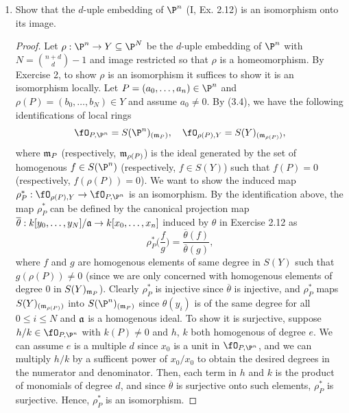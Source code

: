 \documentclass[a4paper]{article}
\begin{document}
\begin{enumerate} [label=\textbf{\arabic*.}, leftmargin=-0.05em]
\item[\textbf{4.}] Show that the $d$-uple embedding of $\P^n$ (I, Ex. 2.12) is an isomorphism onto its image.

\begin{proof}
   Let $\rho : \P^n \to Y \subseteq \P^N$ be the $d$-uple embedding of $\P^n$ with $N = \binom{n + d}{d} - 1$ and image restricted so that $\rho$ is a homeomorphism.
   By Exercise 2, to show $\rho$ is an isomorphism it suffices to show it is an isomorphism locally.
   Let $P = (a_0, \dots, a_n) \in \P^n$ and $\rho(P) = (b_0, \dots, b_N) \in Y$ and assume $a_0 \neq 0$.
   By (3.4), we have the following identifications of local rings
   \begin{equation*}
        \fO_{P, \P^n} = S(\P^n)_{(\goth{m}_P)}, \quad \fO_{\rho(P), Y} = S(Y)_{(\goth{m}_{\rho(P)})},
   \end{equation*}
   where $\mathfrak{m}_P$ (respectively, $\mathfrak{m}_{\rho(P)}$) is the ideal generated by the set of homogenous $f \in S(\P^n)$ (respectively, $f \in S(Y)$) such that $f(P) = 0$ (respectively, $f(\rho(P)) = 0$).
   We want to show the induced map $\rho_P^* : \fO_{\rho(P), Y} \to \fO_{P, \P^n}$ is an isomorphism.
   By the identification above, the map $\rho_P^*$ can be defined by the canonical projection map $\overline{\theta} : k[y_0, \dots, y_N] / \mathfrak{a} \to k[x_0, \dots, x_n]$ induced by $\theta$ in Exercise 2.12 as
   \begin{equation*}
        \rho_P^*\bigg( \frac{f}{g} \bigg) = \frac{\overline{\theta}(f)}{\overline{\theta}(g)},
   \end{equation*}
   where $f$ and $g$ are homogenous elements of same degree in $S(Y)$ such that $g(\rho(P)) \neq 0$ (since we are only concerned with homogenous elements of degree $0$ in $S(Y)_{\mathfrak{m}_P}$).
   Clearly $\rho_P^*$ is injective since $\overline{\theta}$ is injective, and $\rho_P^*$ maps $S(Y)_{(\mathfrak{m}_{\rho(P)})}$ into $S(\P^n)_{(\goth{m}_P)}$ since $\theta(y_i)$ is of the same degree for all $0 \leq i \leq N$ and $\mathfrak{a}$ is a homogenous ideal.
   To show it is surjective, suppose $h / k \in \fO_{P, \P^n}$ with $k(P) \neq 0$ and $h$, $k$ both homogenous of degree $e$.
   We can assume $e$ is a multiple $d$ since $x_0$ is a unit in $\fO_{P, \P^n}$, and we can multiply $h / k$ by a sufficent power of $x_0 / x_0$ to obtain the desired degrees in the numerator and denominator.
   Then, each term in $h$ and $k$ is the product of monomials of degree $d$, and since $\overline{\theta}$ is surjective onto such elements, $\rho_P^*$ is surjective. Hence, $\rho_P^*$ is an isomorphism.
\end{proof}


\end{enumerate}
\end{document}
